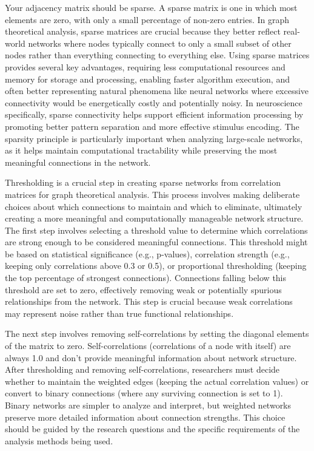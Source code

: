 Your adjacency matrix should be sparse. A sparse matrix is one in which most elements are zero, with only a small percentage of non-zero entries. In graph theoretical analysis, sparse matrices are crucial because they better reflect real-world networks where nodes typically connect to only a small subset of other nodes rather than everything connecting to everything else. Using sparse matrices provides several key advantages, requiring less computational resources and memory for storage and processing, enabling faster algorithm execution, and often better representing natural phenomena like neural networks where excessive connectivity would be energetically costly and potentially noisy. In neuroscience specifically, sparse connectivity helps support efficient information processing by promoting better pattern separation and more effective stimulus encoding. The sparsity principle is particularly important when analyzing large-scale networks, as it helps maintain computational tractability while preserving the most meaningful connections in the network.


Thresholding is a crucial step in creating sparse networks from correlation matrices for graph theoretical analysis. This process involves making deliberate choices about which connections to maintain and which to eliminate, ultimately creating a more meaningful and computationally manageable network structure.
The first step involves selecting a threshold value to determine which correlations are strong enough to be considered meaningful connections. This threshold might be based on statistical significance (e.g., p-values), correlation strength (e.g., keeping only correlations above 0.3 or 0.5), or proportional thresholding (keeping the top percentage of strongest connections). Connections falling below this threshold are set to zero, effectively removing weak or potentially spurious relationships from the network. This step is crucial because weak correlations may represent noise rather than true functional relationships.

The next step involves removing self-correlations by setting the diagonal elements of the matrix to zero. Self-correlations (correlations of a node with itself) are always 1.0 and don't provide meaningful information about network structure. After thresholding and removing self-correlations, researchers must decide whether to maintain the weighted edges (keeping the actual correlation values) or convert to binary connections (where any surviving connection is set to 1). Binary networks are simpler to analyze and interpret, but weighted networks preserve more detailed information about connection strengths. This choice should be guided by the research questions and the specific requirements of the analysis methods being used.

